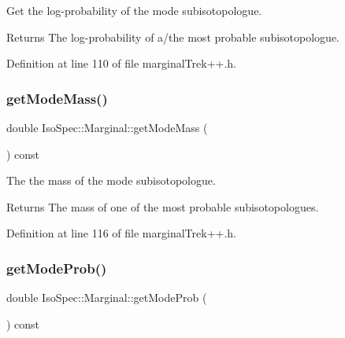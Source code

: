 Get the log-\/probability of the mode subisotopologue. 

\begin{DoxyReturn}{Returns}
The log-\/probability of a/the most probable subisotopologue. 
\end{DoxyReturn}


Definition at line 110 of file marginal\+Trek++.\+h.

\mbox{\label{class_iso_spec_1_1_marginal_ad2121802133075a87f0987dc27d0617f}} 
\subsubsection{\texorpdfstring{get\+Mode\+Mass()}{getModeMass()}}
{\footnotesize\ttfamily double Iso\+Spec\+::\+Marginal\+::get\+Mode\+Mass (\begin{DoxyParamCaption}{ }\end{DoxyParamCaption}) const\hspace{0.3cm}{\ttfamily [inline]}}



The the mass of the mode subisotopologue. 

\begin{DoxyReturn}{Returns}
The mass of one of the most probable subisotopologues. 
\end{DoxyReturn}


Definition at line 116 of file marginal\+Trek++.\+h.

\mbox{\label{class_iso_spec_1_1_marginal_a7bc1eeba342977de3a77c3c7e6ca55b0}} 
\subsubsection{\texorpdfstring{get\+Mode\+Prob()}{getModeProb()}}
{\footnotesize\ttfamily double Iso\+Spec\+::\+Marginal\+::get\+Mode\+Prob (\begin{DoxyParamCaption}{ }\end{DoxyParamCaption}) const\hspace{0.3cm}{\ttfamily [inline]}}



